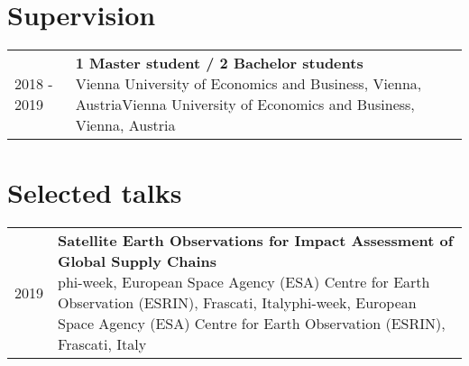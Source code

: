 \documentclass[10pt,a4paper,]{article}
\makeatletter
\def\detaileditem#1#2#3#4#5{
#2 & \parbox[t]{0.85\textwidth}{%
      \textbf{#1}\hfill{\footnotesize #3}\\
      \ifx#4\empty\else#4\par\fi%
      \ifx#5\empty\else{%
        \vspace{0.1cm}\begin{minipage}{0.7\textwidth}%
        \begin{itemize}#5\end{itemize}%
        \end{minipage}}\fi%
      \vspace{\parsep}}\\}
\def\detailedsection#1{\begin{longtable}{@{\extracolsep{\fill}}ll}#1\end{longtable}}
\makeatother
\begin{document}
\section{Supervision}\label{supervision}

\detailedsection{\detaileditem{1 Master student / 2 Bachelor students}{2018 - 2019}{}{Vienna University of Economics and Business, Vienna, Austria}{\empty}\detaileditem{1 Master student}{2017 - 2018}{}{University of Applied Sciences Wiener Neustadt, Wiener Neustadt-Niederösterreich, Austria}{\empty}\detaileditem{2 PhD students in the Young Scientist Summer Program (YSSP)}{2017 - 2017}{}{International Institute for Applied Systems Analysis, Laxenburg-Niederösterreich, Austria}{\empty}}

\section{Selected talks}\label{selected-talks}

\detailedsection{\detaileditem{Satellite Earth Observations for Impact Assessment of Global Supply Chains}{2019}{}{phi-week, European Space Agency (ESA) Centre for Earth Observation (ESRIN), Frascati, Italy}{\empty}\detaileditem{Using global crop maps to improve the estimation of impacts associated with biomass production}{2019}{}{II Austrian Conference on International Resource Politics - Resources for a social-ecological transformation, Innsbruck University, Innsbruck, Austria}{\empty}\detaileditem{dtwSat: An R Package for Land Cover Classification Using Satellite Image Time Series}{2017}{}{Open Science Conference 2017, European Space Agency (ESA) Centre for Earth Observation (ESRIN), Frascati, Italy}{\empty}\detaileditem{Big Earth observation data analytics for land use and land cover change in the Brazilian Amazon}{2016}{}{Doctoral program in interdisciplinary environmental sciences (DENVI) Annual Meeting, University of Helsinki, Helsinki, Finland}{\empty}\detaileditem{Big Earth Observation Data Analytics: Matching Requirements to System Architectures}{2016}{}{Lecture at the Linköping University, Linköping University, Linköping, Sweden}{\empty}\detaileditem{Time-Weighted Dynamic Time Warping for satellite image time series analysis}{2016}{}{Lecture at the Humboldt University of Berlin, Humboldt University of Berlin, Berlin, Germany}{\empty}\detaileditem{Large-scale agricultural mapping using big earth observation data}{2016}{}{Brazil-Sweden Excellence Seminar, Coordination for the Improvement of Higher Education Personnel (CAPES), Brasília, Brazil}{\empty}}
\end{document}
